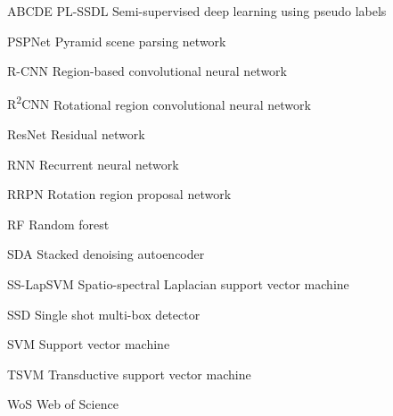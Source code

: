 \begin{seznamzkratek}{ABCDE}
	      {PL-SSDL}
	      {Semi-supervised deep learning using pseudo labels}

	      {PSPNet}
	      {Pyramid scene parsing network}

	      {R-CNN}
	      {Region-based convolutional neural network}

	      {R\textsuperscript{2}CNN}
	      {Rotational region convolutional neural network}

	      {ResNet}
	      {Residual network}

	      {RNN}
	      {Recurrent neural network}

	      {RRPN}
	      {Rotation region proposal network}

	      {RF}
	      {Random forest}

	      {SDA}
	      {Stacked denoising autoencoder}

	      {SS-LapSVM}
	      {Spatio-spectral Laplacian support vector machine}

	      {SSD}
	      {Single shot multi-box detector}

	      {SVM}
	      {Support vector machine}

	      {TSVM}
	      {Transductive support vector machine}

	      {WoS}
	      {Web of Science}
	      
\end{seznamzkratek}